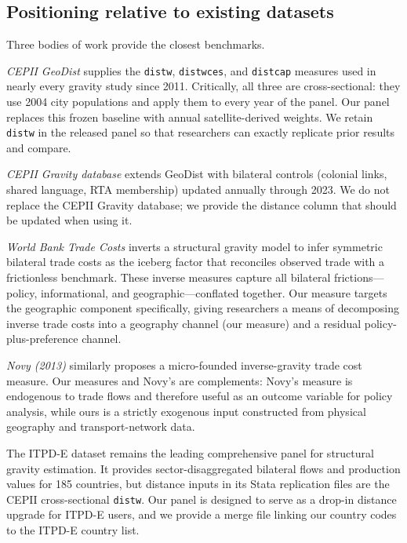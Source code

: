 \documentclass[11pt, a4paper]{article}
\begin{document}
\subsection{Positioning relative to existing datasets}

Three bodies of work provide the closest benchmarks.

\emph{CEPII GeoDist} \citep{mayer_zignago_2011} supplies the \texttt{distw},
\texttt{distwces}, and \texttt{distcap} measures used in nearly every gravity
study since 2011.
Critically, all three are cross-sectional: they use 2004 city populations and
apply them to every year of the panel.
Our panel replaces this frozen baseline with annual satellite-derived weights.
We retain \texttt{distw} in the released panel so that researchers can exactly
replicate prior results and compare.

\emph{CEPII Gravity database} \citep{conte_cotterlaz_mayer_2022} extends
GeoDist with bilateral controls (colonial links, shared language, RTA membership)
updated annually through 2023.
We do not replace the CEPII Gravity database; we provide the distance column
that should be updated when using it.

\emph{World Bank Trade Costs} \citep{arvis_duval_shepherd_utoktham_2013}
inverts a structural gravity model to infer symmetric bilateral trade costs
as the iceberg factor that reconciles observed trade with a frictionless
benchmark.
These inverse measures capture all bilateral frictions---policy, informational,
and geographic---conflated together.
Our measure targets the geographic component specifically, giving researchers
a means of decomposing inverse trade costs into a geography channel
(our measure) and a residual policy-plus-preference channel.

\emph{Novy (2013)} similarly proposes a micro-founded inverse-gravity trade
cost measure.
Our measures and Novy's are complements: Novy's measure is endogenous to
trade flows and therefore useful as an outcome variable for policy analysis,
while ours is a strictly exogenous input constructed from physical geography
and transport-network data.

The \citet{borchert_larch_shikher_yotov_2022} ITPD-E dataset remains the
leading comprehensive panel for structural gravity estimation.
It provides sector-disaggregated bilateral flows and production values for
185 countries, but distance inputs in its Stata replication files are the
CEPII cross-sectional \texttt{distw}.
Our panel is designed to serve as a drop-in distance upgrade for ITPD-E
users, and we provide a merge file linking our country codes to the ITPD-E
country list.
\end{document}
